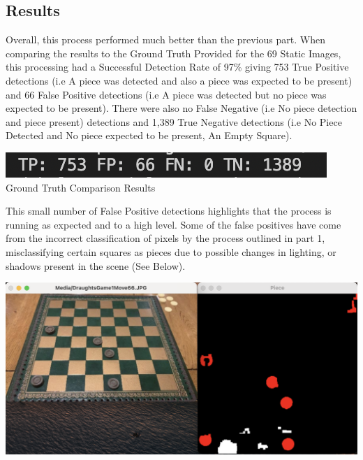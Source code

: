 \documentclass[12pt]{article}
\begin{document}
    \subsection{Results}
    \par
    Overall, this process performed much better than the previous part. When comparing the results to the Ground Truth Provided for the 69 Static Images, this processing had a Successful Detection Rate of 97\% giving 753 True Positive detections (i.e A piece was detected and also a piece was
    expected to be present) and 66 False Positive detections (i.e A piece was detected but no piece was expected to be present). There were also no False Negative (i.e No piece detection and piece present) detections and 1,389 True Negative detections (i.e No Piece Detected and No piece expected 
    to be present, An Empty Square).
    \begin{center}
        \includegraphics[scale=1]{AssignPt2Res.png}
        \newline
        Ground Truth Comparison Results
    \end{center}
    \par
    This small number of False Positive detections highlights that the process is running as expected and to a high level. Some of the false positives have come from the incorrect classification of pixels by the process outlined in part 1, misclassifying certain squares as pieces due to possible 
    changes in lighting, or shadows present in the scene (See Below).
    \begin{center}
        \includegraphics[scale=0.2]{FPExample.png}
        \newline
    \end{center}
\end{document}
